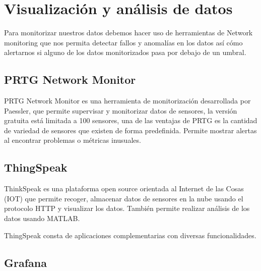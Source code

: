 \begin{comment}
\subsection{Apache Flume}

Apache Flume es un servicio distribuido capaz de mover grandes cantidades de datos y logs, este forma parte del ecosistema de Hadoop. Su arquitectura es tanto flexible cómo sencilla. aunque presenta cierta dificultad a la hora de escalar. Está basado en flujo de datos en Streaming permitiendo múltiples flujos.\cite{pagina:Flume}
\end{comment}
\section{Visualización y análisis de datos}

Para monitorizar nuestros datos debemos hacer uso de herramientas de Network monitoring que nos permita detectar fallos y anomalías en los datos así cómo alertarnos si alguno de los datos monitorizados pasa por debajo de un umbral.

\subsection{PRTG Network Monitor}

PRTG Network Monitor es una herramienta de monitorización desarrollada por Paessler, que permite supervisar y monitorizar datos de sensores, la versión gratuita está limitada a 100 sensores, una de las ventajas de PRTG es la cantidad de variedad de sensores que existen de forma predefinida. Permite mostrar alertas al encontrar problemas o métricas inusuales.\cite{pagina:PRTG}

\subsection{ThingSpeak}

ThinkSpeak es una plataforma open source orientada al Internet de las Cosas (IOT) que permite recoger, almacenar datos de sensores en la nube usando el protocolo HTTP y visualizar los datos. También permite realizar análisis de los datos usando MATLAB. 

ThingSpeak consta de aplicaciones complementarias con diversas funcionalidades. \cite{pagina:ThingSpeak}

\subsection{Grafana}

